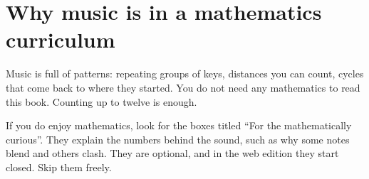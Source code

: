 \section*{Why music is in a mathematics curriculum}

Music is full of patterns: repeating groups of keys, distances you can count, cycles that come back to where they started. You do not need any mathematics to read this book. Counting up to twelve is enough.

If you do enjoy mathematics, look for the boxes titled ``For the mathematically curious''. They explain the numbers behind the sound, such as why some notes blend and others clash. They are optional, and in the web edition they start closed. Skip them freely.
